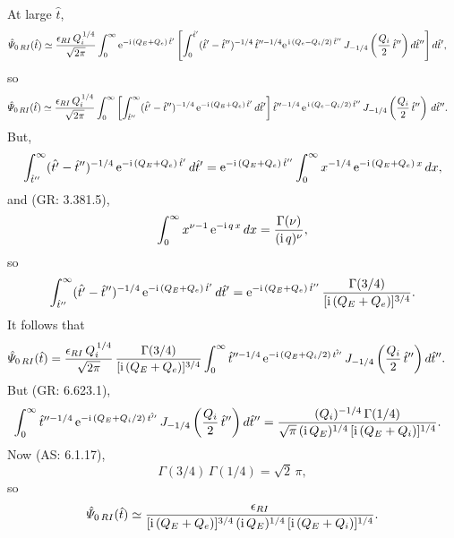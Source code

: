 \documentclass[titlepage=false,12pt]{article}
\begin{document}
At large $\hat{t}$, 
\begin{align}
\hat{\mit\Psi}_{0\,RI}(\hat{t}) &\simeq \frac{\epsilon_{RI}\,Q_i^{\,1/4}}{\sqrt{2\pi}}\int_0^{\infty}{\rm e}^{-{\rm i}\,(Q_E+Q_e)\,\hat{t}'}
\left[\int_0^{\hat{t}'}(\hat{t}'-\hat{t}'')^{-1/4}\,\hat{t}''^{-1/4}
{\rm e}^{\,{\rm i}\,(Q_e-Q_i/2)\,\hat{t}''}\,J_{-1/4}\left(\frac{Q_i}{2}\,\hat{t}''\right)d\hat{t}''\right]d\hat{t}',
\end{align}
so
\begin{align}
\hat{\mit\Psi}_{0\,RI}(\hat{t}) &\simeq \frac{\epsilon_{RI}\,Q_i^{\,1/4}}{\sqrt{2\pi}}
\int_0^\infty\left[\int_{\hat{t}''}^\infty(\hat{t'}-\hat{t}'')^{-1/4}\,{\rm e}^{-{\rm i}\,(Q_E+Q_e)\,\hat{t}'}\,d\hat{t}'\right]
 \hat{t}''^{-1/4}\,{\rm e}^{\,{\rm i}\,(Q_e-Q_i/2)\,\hat{t}''}\,J_{-1/4}\left(\frac{Q_i}{2}\,\hat{t}''\right)\,d\hat{t}''.
\end{align}
But,
\begin{align}
\int_{\hat{t}''}^\infty(\hat{t'}-\hat{t}'')^{-1/4}\,{\rm e}^{-{\rm i}\,(Q_E+Q_e)\,\hat{t}'}\,d\hat{t}'={\rm e}^{-{\rm i}\,(Q_E+Q_e)\,\hat{t}''} \int_0^\infty
x^{-1/4}\,{\rm e}^{-{\rm i}\,(Q_E+Q_e)\,x}\,dx,
\end{align}
and (GR: 3.381.5), 
\begin{equation}
\int_0^\infty x^{\nu-1}\,{\rm e}^{-{\rm i}\,q\,x}\,dx = \frac{\Gamma(\nu)}{({\rm i}\,q)^{\nu}},
\end{equation}
so 
\begin{equation}
\int_{\hat{t}''}^\infty (\hat{t'}-\hat{t}'')^{-1/4}\,{\rm e}^{-{\rm i}\,(Q_E+Q_e)\,\hat{t}'}\,d\hat{t}'={\rm e}^{-{\rm i}\,(Q_E+Q_e)\,\hat{t}''} \, \frac{\Gamma(3/4)}{[{\rm i}\,(Q_E+Q_e)]^{3/4}}.
\end{equation}
It follows that
\begin{align}
\hat{\mit\Psi}_{0\,RI}(\hat{t})&= \frac{\epsilon_{RI}\,Q_i^{\,1/4}}{\sqrt{2\pi}}\,\frac{\Gamma(3/4)}{[{\rm i}\,(Q_E+Q_e)]^{3/4}}
\int_0^\infty \hat{t}''^{-1/4}\,{\rm e}^{-{\rm i}\,(Q_E+Q_i/2)\,\hat{t''}}\,J_{-1/4}\left(\frac{Q_i}{2}\,\hat{t}''\right)d\hat{t}''.
\end{align}
But (GR: 6.623.1), 
\begin{align}
&\int_0^\infty \hat{t}''^{-1/4}\,{\rm e}^{-{\rm i}\,(Q_E+Q_i/2)\,\hat{t''}}\,J_{-1/4}\left(\frac{Q_i}{2}\,\hat{t}''\right)d\hat{t}'' 
= \frac{(Q_i)^{-1/4}\,\Gamma(1/4)}{\sqrt{\pi}\,({\rm i}\,Q_E)^{1/4}\,[{\rm i}\,(Q_E+Q_i)]^{1/4}}.
\end{align}
Now (AS: 6.1.17),
\begin{equation}
\Gamma(3/4)\,\Gamma(1/4)= \sqrt{2}\,\pi,
\end{equation}
so
\begin{equation}
\hat{\mit\Psi}_{0\,RI}(\hat{t})\simeq 
\frac{\epsilon_{RI}}{[{\rm i}\,(Q_E+Q_e)]^{3/4}\,({\rm i}\,Q_E)^{1/4}\,[{\rm i}\,(Q_E+Q_i)]^{1/4}}.
\end{equation}
\end{document}
